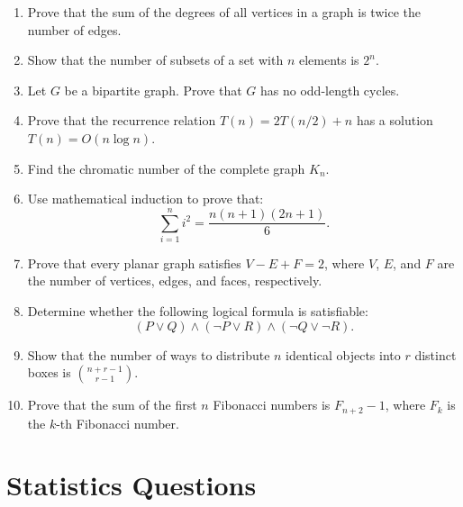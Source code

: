 \documentclass{article}
\begin{document}
\begin{enumerate}
    \item Prove that the sum of the degrees of all vertices in a graph is twice the number of edges.

    \item Show that the number of subsets of a set with \( n \) elements is \( 2^n \).

    \item Let \( G \) be a bipartite graph. Prove that \( G \) has no odd-length cycles.

    \item Prove that the recurrence relation \( T(n) = 2T(n/2) + n \) has a solution \( T(n) = O(n \log n) \).

    \item Find the chromatic number of the complete graph \( K_n \).

    \item Use mathematical induction to prove that:
    \[
    \sum_{i=1}^n i^2 = \frac{n(n+1)(2n+1)}{6}.
    \]

    \item Prove that every planar graph satisfies \( V - E + F = 2 \), where \( V \), \( E \), and \( F \) are the number of vertices, edges, and faces, respectively.

    \item Determine whether the following logical formula is satisfiable:
    \[
    (P \lor Q) \land (\neg P \lor R) \land (\neg Q \lor \neg R).
    \]

    \item Show that the number of ways to distribute \( n \) identical objects into \( r \) distinct boxes is \( \binom{n+r-1}{r-1} \).

    \item Prove that the sum of the first \( n \) Fibonacci numbers is \( F_{n+2} - 1 \), where \( F_k \) is the \( k \)-th Fibonacci number.
\end{enumerate}

\section*{Statistics Questions}
\end{document}
